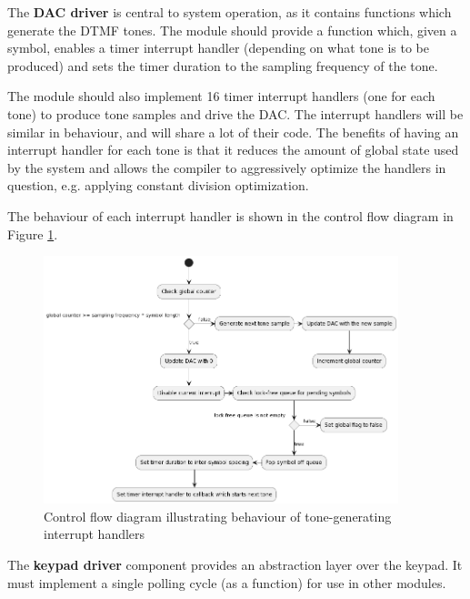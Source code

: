 \documentclass[11pt,a4paper,twocolumn]{scrartcl}
\begin{document}
The \textbf{DAC driver} is central to system operation, as it contains functions which generate the DTMF tones. The module should provide a function which, 
given a symbol, enables a timer interrupt handler (depending on what tone is to be produced) and sets the timer duration to the sampling frequency of the tone.

The module should also implement 16 timer interrupt handlers (one for each tone) to produce tone samples and drive the DAC. The interrupt handlers will be similar in behaviour, and will share a lot of their code. The benefits of having an interrupt handler for each tone is that it reduces the amount of global state used by the system and allows the compiler to aggressively optimize the handlers in question, e.g. applying constant division optimization.

The behaviour of each interrupt handler is shown in the control flow diagram in Figure \ref{fig:tone_interrupt_cfd}.

\begin{figure}
   \centering
   \includegraphics[width=0.92\textwidth]{tone_interrupt_cfd}
   \caption{Control flow diagram illustrating behaviour of tone-generating interrupt handlers}
   \label{fig:tone_interrupt_cfd}
\end{figure}

The \textbf{keypad driver} component provides an abstraction layer over the keypad. It must implement a single polling cycle (as a function) for use in other modules.
\end{document}
